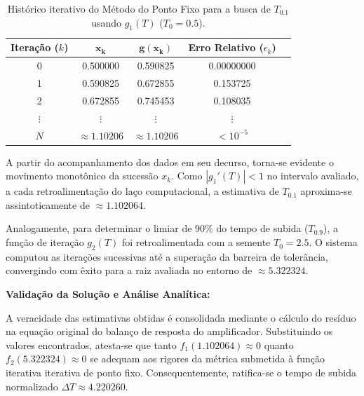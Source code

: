 \begin{table}[htpb]
\centering
\caption{Histórico iterativo do Método do Ponto Fixo para a busca de $T_{0.1}$ usando $g_1(T)$ ($T_0 = 0.5$).}
\label{tab:ponto_fixo_f1}
\small
\begin{tabular}{@{}ccccc@{}}
\toprule
\textbf{Iteração ($k$)} & $\mathbf{x_k}$ & $\mathbf{g(x_k)}$ & \textbf{Erro Relativo} ($\epsilon_k$) \\ \midrule
0 & 0.500000 & 0.590825 & 0.00000000 \\
1 & 0.590825 & 0.672855 & 0.153725 \\
2 & 0.672855 & 0.745453 & 0.108035 \\
$\vdots$ & $\vdots$ & $\vdots$ & $\vdots$ \\
$N$ & $\approx 1.10206$ & $\approx 1.10206$ & $< 10^{-5}$ \\ \bottomrule
\end{tabular}
\end{table}

A partir do acompanhamento dos dados em seu decurso, torna-se evidente o movimento monotônico da sucessão $x_k$. Como $|g_1'(T)| < 1$ no intervalo avaliado, a cada retroalimentação do laço computacional, a estimativa de $T_{0.1}$ aproxima-se assintoticamente de $\approx 1.102064$.

Analogamente, para determinar o limiar de $90\%$ do tempo de subida ($T_{0.9}$), a função de iteração $g_2(T)$ foi retroalimentada com a semente $T_0 = 2.5$. O sistema computou as iterações sucessivas até a superação da barreira de tolerância, convergindo com êxito para a raiz avaliada no entorno de $\approx 5.322324$.

\textbf{Validação da Solução e Análise Analítica:}

A veracidade das estimativas obtidas é consolidada mediante o cálculo do resíduo na equação original do balanço de resposta do amplificador. Substituindo os valores encontrados, atesta-se que tanto $f_1(1.102064) \approx 0$ quanto $f_2(5.322324) \approx 0$ se adequam aos rigores da métrica submetida à função iterativa iterativa de ponto fixo.
Consequentemente, ratifica-se o tempo de subida normalizado $\Delta T \approx 4.220260$. 

